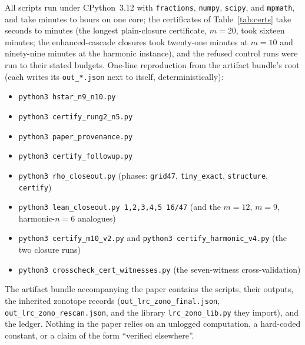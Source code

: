 All scripts run under CPython~3.12 with \texttt{fractions},
\texttt{numpy}, \texttt{scipy}, and \texttt{mpmath}, and take minutes
to hours on one core; the certificates of Table~\ref{tab:certs} take
seconds to minutes (the longest plain-closure certificate, $m=20$, took
sixteen minutes; the enhanced-cascade closures took twenty-one minutes
at $m=10$ and ninety-nine minutes at the harmonic instance), and the
refused control runs were run to their stated
budgets. One-line reproduction from the artifact bundle's root (each
writes its \texttt{out\_*.json} next to itself, deterministically):
\begin{itemize}[leftmargin=2.2em,itemsep=1pt,topsep=2pt]
\item \texttt{python3 hstar\_n9\_n10.py}
\item \texttt{python3 certify\_rung2\_n5.py}
\item \texttt{python3 paper\_provenance.py}
\item \texttt{python3 certify\_followup.py}
\item \texttt{python3 rho\_closeout.py} (phases: \texttt{grid47},
\texttt{tiny\_exact}, \texttt{structure}, \texttt{certify})
\item \texttt{python3 lean\_closeout.py 1,2,3,4,5 16/47} (and the
$m=12$, $m=9$, harmonic-$n=6$ analogues)
\item \texttt{python3 certify\_m10\_v2.py} and
\texttt{python3 certify\_harmonic\_v4.py} (the two closure runs)
\item \texttt{python3 crosscheck\_cert\_witnesses.py} (the
seven-witness cross-validation)
\end{itemize} The artifact
bundle accompanying the paper contains the scripts, their outputs,
the inherited zonotope records
(\texttt{out\_lrc\_zono\_final.json},
\texttt{out\_lrc\_zono\_rescan.json}, and the library
\texttt{lrc\_zono\_lib.py} they import), and the ledger. Nothing in the
paper relies on an unlogged computation, a hard-coded constant, or a
claim of the form ``verified elsewhere''.
